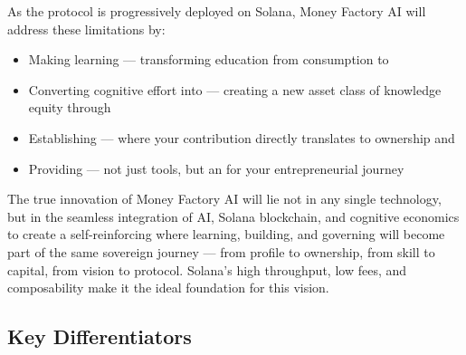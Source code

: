 As the protocol is progressively deployed on Solana, Money Factory AI will address these limitations by:

\begin{itemize}
    \item Making learning  — transforming education from consumption to 
    
    \item Converting cognitive effort into  — creating a new asset class of knowledge equity through 
    
    \item Establishing  — where your contribution directly translates to ownership and 
    
    \item Providing  — not just tools, but an  for your entrepreneurial journey
\end{itemize}

\begin{mfai-note}
The true innovation of Money Factory AI will lie not in any single technology, but in the seamless integration of AI, Solana blockchain, and cognitive economics to create a self-reinforcing  where learning, building, and governing will become part of the same sovereign journey — from profile to ownership, from skill to capital, from vision to protocol. Solana's high throughput, low fees, and composability make it the ideal foundation for this vision.
\end{mfai-note}

\subsection*{Key Differentiators}

